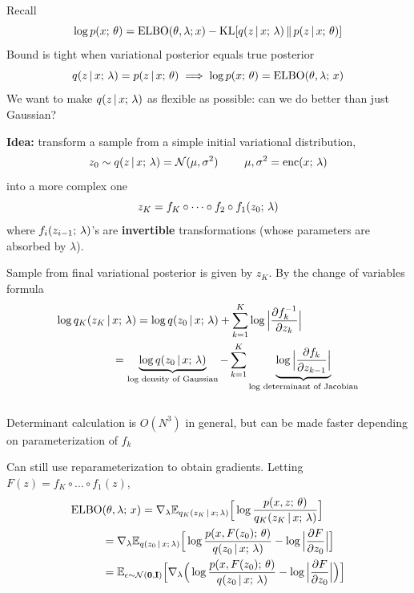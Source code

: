 \begin{frame}
Recall
\[ \log p(x ; \, \theta)  = \operatorname*{ELBO}(\theta, \lambda; x) - \operatorname*{KL}[q(z \,|\, x ; \, \lambda)  \, \Vert \, p(z \,|\, x ; \, \theta)]  \]
Bound is tight when variational posterior equals true posterior
\[ q(z \,|\, x ; \, \lambda) = p(z \,|\, x ; \, \theta) \implies \log p(x ; \, \theta) = \operatorname*{ELBO}( \theta,  \lambda ; \, x) \]
We want to make $q(z \,|\, x ; \, \lambda)$ as flexible as possible:
can we do better than just Gaussian?
\end{frame} 

\begin{frame}
\textbf{Idea:} transform a sample from a simple initial variational distribution, 
\[ z_0 \sim q(z \,|\, x ; \, \lambda) = \mathcal{N}(\mu, \sigma^2) \,\,\,\,\,\,\,\,\,\,\,\,\,\, \mu, \sigma^2 = \operatorname*{enc}(x ; \, \lambda)\]
into a more complex one
\[ z_K = f_K \circ \dots \circ f_2 \circ f_1(z_0 ; \, \lambda)\]
where $f_i(z_{i-1}; \, \lambda)$'s are \textbf{invertible} transformations (whose parameters are
absorbed by $\lambda$).
\end{frame} 


\begin{frame}
Sample from final variational posterior is given by $z_K$. By the change of variables formula
\begin{align*}
\log q_K(z_K \,|\, &x ; \, \lambda) = \log q(z_0 \,|\, x ; \, \lambda) + 
\sum_{k=1}^K \log \Big | \frac{\partial f_k^{-1}}{\partial z_{k}}\Big |  \\
&=\underbrace{\log q(z_0 \,|\, x ; \, \lambda)}_{\text{log density of Gaussian}} - 
\sum_{k=1}^K \underbrace{\log \Big | \frac{\partial f_k}{\partial z_{k-1}}\Big |}_{\text{log determinant of Jacobian}} 
\end{align*}
\\
\vspace{5mm}
Determinant calculation is $O(N^3)$ in general, but can be made faster depending on parameterization of $f_k$ 
\end{frame} 

\begin{frame}
Can still use reparameterization  to obtain gradients.  Letting $F(z) = f_{K} \circ \dots \circ f_1 (z) $,
\begin{align*}
\operatorname*{ELBO}&(\theta, \lambda ; \, x) = \nabla_\lambda \mathbb{E}_{q_K(z_K \,|\, x ; \, \lambda)}\Big[\log \frac{p (x, z  ; \, \theta)}{q_K(z_K \,|\, x ; \, \lambda)}\Big] \\
&= \nabla_\lambda \mathbb{E}_{q(z_0 \,|\, x ; \, \lambda)}\Big[\log \frac{p (x, F(z_0) ; \, \theta)}{q(z_0 \,|\, x ; \, \lambda)} - \log \Big| \frac{\partial F}{\partial z_0}\Big|\Big] \\
&=  \mathbb{E}_{\epsilon \sim \mathcal{N}(\mathbf{0}, \mathbf{I})}\Big[\nabla_\lambda \Big( \log \frac{p (x, F(z_0) ; \, \theta)}{q(z_0 \,|\, x ; \, \lambda)} - \log \Big| \frac{\partial F}{\partial z_0}\Big|\Big) \Big] 
\end{align*}
\end{frame} 

